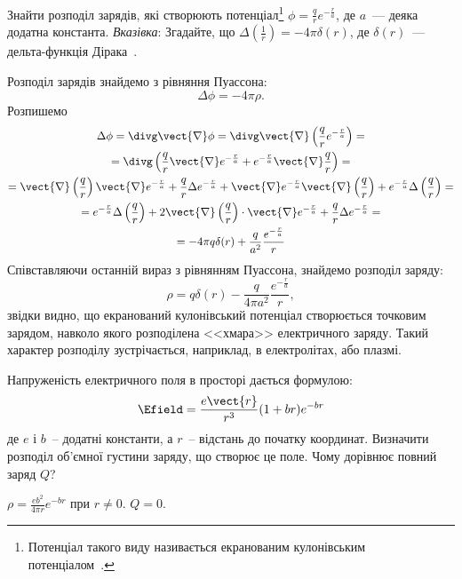 \begin{problem}
Знайти розподіл зарядів, які створюють  потенціал\footnote{Потенціал такого виду називається екранованим кулонівським потенціалом~\cite[\S 1.8, стор.26]{AxiezerGeneralPhysElectro}.} $\phi = \frac{q}{r}e^{-\frac{r}{a}}$, де $a$~--- деяка додатна константа. \emph{Вказівка}: Згадайте, що $\Delta\left(\frac{1}{r}\right) =  -4\pi\delta(r)$, де $\delta(r)$~--- дельта-функція Дірака~\cite[Глава I]{Ivanenko}.
\begin{solution}
	Розподіл зарядів знайдемо з рівняння Пуассона:
	\[
		\Delta\phi = -4\pi\rho.
	\]
	Розпишемо
	\begin{multline*}
		\Delta\phi = \divg\vect{\nabla}\phi = \divg\vect{\nabla}\left( \frac{q}{r}e^{-\frac{r}{a}}\right)  = \\
		= \divg\left( \frac{q}{r}  \vect{\nabla}e^{-\frac{r}{a}} + e^{-\frac{r}{a}}\vect{\nabla}\frac{q}{r}\right) = \\
		= \vect{\nabla}\left( \frac{q}{r}\right) \vect{\nabla}e^{-\frac{r}{a}} + \frac{q}{r}\Delta e^{-\frac{r}{a}} +
		\vect{\nabla}e^{-\frac{r}{a}} \vect{\nabla}\left( \frac{q}{r}\right)  + e^{-\frac{r}{a}}\Delta\left( \frac{q}{r}\right) = \\
		= e^{-\frac{r}{a}}\Delta\left( \frac{q}{r}\right) + 2 \vect{\nabla}\left( \frac{q}{r}\right)\cdot \vect{\nabla}e^{-\frac{r}{a}} + \frac{q}{r}\Delta e^{-\frac{r}{a}} =\\
		= -4\pi q\delta(r)	+ \frac{q}{a^2}\frac{e^{-\frac{r}{a}}}{r}
	\end{multline*}
	Співставляючи останній вираз з рівнянням Пуассона, знайдемо розподіл заряду:
	\[
		\rho = q\delta(r) - \frac{q}{4\pi a^2} \frac{e^{-\frac{r}{a}}}{r},
	\]
	звідки видно, що екранований кулонівський потенціал створюється точковим зарядом, навколо якого розподілена <<хмара>> електричного заряду. Такий характер розподілу зустрічається, наприклад, в електролітах, або плазмі.
\end{solution}
\end{problem}

\begin{problem}
Напруженість електричного поля в просторі дається формулою:
\[
	\Efield = \frac{e\vect{r}}{r^3}(1 + br)e^{-br}
\]
де $e$ і $b$~-- додатні константи, а $r$~-- відстань до початку координат. Визначити розподіл об'ємної густини заряду, що створює це поле. Чому дорівнює повний заряд $Q$?
\begin{solution}
	$\rho = \frac{eb^2}{4\pi r}e^{-br}$ при $r \neq 0$. $Q = 0$.
\end{solution}
\end{problem}

